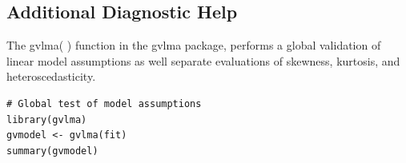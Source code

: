 \documentclass[residuals.tex]{subfiles}
\begin{document}
\subsection{Additional Diagnostic Help}
The gvlma( ) function in the gvlma package, performs a global validation of linear model assumptions as well separate evaluations of skewness, kurtosis, and heteroscedasticity.
\begin{framed}
\begin{verbatim}
# Global test of model assumptions
library(gvlma)
gvmodel <- gvlma(fit) 
summary(gvmodel)
\end{verbatim}
\end{framed}
\end{document}
